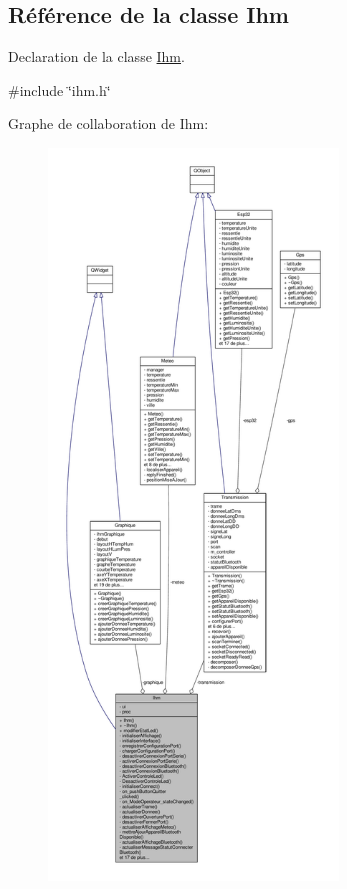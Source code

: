 \hypertarget{class_ihm}{}\subsection{Référence de la classe Ihm}
\label{class_ihm}


Declaration de la classe \hyperlink{class_ihm}{Ihm}.  




{\ttfamily \#include \char`\"{}ihm.\+h\char`\"{}}



Graphe de collaboration de Ihm\+:\nopagebreak
\begin{figure}[H]
\begin{center}
\leavevmode
\includegraphics[height=550pt]{class_ihm__coll__graph}
\end{center}
\end{figure}
